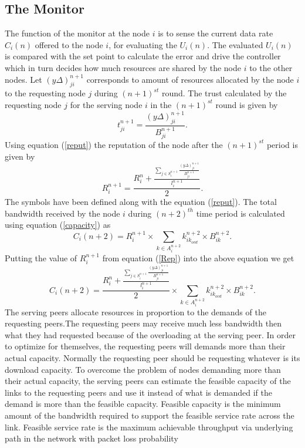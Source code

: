 \documentclass[journal]{IEEEtran}
\begin{document}
\subsection{The Monitor}
The function of the monitor at the node $i$ is to sense the current data rate $C_i(n)$ offered to the node $i$, for evaluating the $U_i(n)$. The evaluated $U_i(n)$ is compared with the set point to calculate the error and drive the controller which in turn decides how much resources are shared by the node $i$ to the other nodes. Let $(y\Delta)_{ji}^{n+1}$ corresponds to amount of resources allocated by the node $i$ to the requesting node $j$ during  $(n+1)^{st}$ round. The trust calculated by the requesting node $j$ for the serving node $i$ in the $(n+1)^{st}$ round is given by
\begin{equation}
	\nonumber
	t_{ji}^{n+1}=\frac{(y\Delta)_{ji}^{n+1}}{B_{ji}^{n+1}}.
\end{equation}
Using equation (\ref{reput}) the reputation of the node after the $(n+1)^{st}$ period is given by 
\begin{equation}
	\label{Rep}
R_{i}^{n+1}=\frac{R_i^n+\frac{{\sum\limits_{j\in{S^{n+1}_i}}{\frac{(y\Delta)_{ji}^{n+1}
					}{B_{ji}^{n+1}}}}} {l_i^{n+1}}}{2}.
\end{equation}
The symbols have been defined along with the equation (\ref{reput}). The total bandwidth received by the node $i$  during $(n+2)^{th}$ time period  is calculated using equation (\ref{capacity}) as 
\begin{equation}
	\nonumber
	C_i(n+2)=R_{i}^{n+1}\times{\sum\limits_{k\in{A^{n+2}_i}}k_{{ik}_{ovd}}^{n+2}{\times}B_{ik}^{n+2}}.
\end{equation}
Putting the value of $R_i^{n+1}$ from equation (\ref{Rep}) into the above equation we get
\begin{equation}
	\label{C_i}
	C_i(n+2)=\frac{R_i^n+{\frac{\sum\limits_{j\in{S^{n+1}_i}}\frac{(y\Delta)_{ji}^{n+1}}{B_{ji}^{n+1}}}{l_i^{n+1}}}}{2}\times{\sum\limits_{k\in{A^{n+2}_i}}k_{{ik}_{ovd}}^{n+2}{\times}B_{ik}^{n+2}}.
\end{equation}
The  serving peers  allocate resources in proportion to the demands of the requesting peers.The requesting peers may receive much less bandwidth then what they had requested because of the overloading at the serving peer. In order to optimize for themselves, the requesting peers will demands more than their actual capacity. Normally the requesting peer should be requesting whatever is its download capacity. To overcome the problem of nodes demanding more than their actual capacity, the serving peers can estimate the feasible capacity of the links to the requesting peers and use it instead of what is demanded if the demand is more than the feasible capacity. Feasible capacity is the minimum amount of the bandwidth required to support the feasible service rate across the link. Feasible service rate is the maximum achievable throughput via underlying path in the network with packet loss probability
\end{document}
